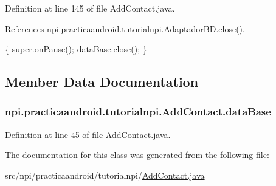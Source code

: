Definition at line 145 of file Add\-Contact.\-java.



References npi.\-practicaandroid.\-tutorialnpi.\-Adaptador\-B\-D.\-close().


\begin{DoxyCode}
                                                      \{
        super.onPause();
        \hyperlink{classnpi_1_1practicaandroid_1_1tutorialnpi_1_1_add_contact_acec65dc472e9b8ad4af1a55b16b6feec}{dataBase}.\hyperlink{classnpi_1_1practicaandroid_1_1tutorialnpi_1_1_adaptador_b_d_a466dc4c61ae61457cf986b5d8c6f6f52}{close}();
    \}
\end{DoxyCode}


\subsection{Member Data Documentation}
\hypertarget{classnpi_1_1practicaandroid_1_1tutorialnpi_1_1_add_contact_acec65dc472e9b8ad4af1a55b16b6feec}{
\subsubsection[{data\-Base}]{ npi.\-practicaandroid.\-tutorialnpi.\-Add\-Contact.\-data\-Base\hspace{0.3cm}{\ttfamily [private]}}}\label{classnpi_1_1practicaandroid_1_1tutorialnpi_1_1_add_contact_acec65dc472e9b8ad4af1a55b16b6feec}


Definition at line 45 of file Add\-Contact.\-java.



The documentation for this class was generated from the following file\-:\begin{DoxyCompactItemize}
\item 
src/npi/practicaandroid/tutorialnpi/\hyperlink{_add_contact_8java}{Add\-Contact.\-java}\end{DoxyCompactItemize}

